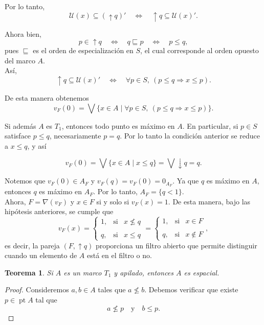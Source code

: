 \documentclass[11pt]{amsart}
\DeclareMathOperator{\pt}{pt}
\theoremstyle{plain}
\newtheorem{thm}{Teorema}[section]
\theoremstyle{definition}
\begin{document}
Por lo tanto,
\[
\mathcal{U}(x)\subseteq (\uparrow q)'
\quad\Longleftrightarrow\quad
\uparrow q\subseteq \mathcal{U}(x)'.
\]

Ahora bien,
\[
p\in \uparrow q
\quad\Longleftrightarrow\quad
q\sqsubseteq p
\quad\Longleftrightarrow\quad
p\leq q,
\]
pues $\sqsubseteq$ es el orden de especialización en $S$, el cual corresponde al orden
opuesto del marco $A$.\\

Así,
\[
\uparrow q\subseteq \mathcal{U}(x)'
\quad\Longleftrightarrow\quad
\forall p\in S,\ (p\leq q \Rightarrow x\leq p).
\]

De esta manera obtenemos
\[
v_F(0)
=\bigvee\{x\in A\mid \forall p\in S,\ (p\leq q \Rightarrow x\leq p)\}.
\]

Si además $A$ es $T_1$, entonces todo punto es máximo en $A$. En particular, si
$p\in S$ satisface $p\leq q$, necesariamente $p=q$. Por lo tanto la condición
anterior se reduce a $x\leq q$, y así

\[
v_F(0)
=\bigvee\{x\in A\mid x\leq q\}
=\bigvee \downarrow q
=q.
\]

Notemos que $v_F(0)\in A_F$ y $v_F(q)=v_F(0)=0_{A_F}$. Ya que $q$ es máximo en $A$, entonces $q$ es máximo en $A_F$.
Por lo tanto, $A_F=\{q<1\}$.\\

Ahora, $F=\nabla(v_F)$ y $x\in F$ si y solo si $v_F(x)=1$. De esta manera, bajo las hipótesis anteriores, se cumple que 
\[
v_F(x)= \left\{ \begin{array}{lcc} 1, & \text{si}  &  x\nleq q\\ \\ q, & \text{si} & x\leq q 
\end{array} \right.=  \left\{ \begin{array}{lcc} 1, & \text{si}  &  x\in F\\ \\ q, & \text{si} & x\not\in F \end{array} \right.,
\]
es decir, la pareja $(F, \uparrow q)$ proporciona un filtro abierto que permite distinguir 
cuando un elemento de $A$ está en el filtro o no.

\begin{thm}\label{Testespacial}
Si $A$ es un marco $T_1$ y apilado, entonces $A$ es espacial.
\end{thm}

\begin{proof}
Consideremos $a, b\in A$ tales que $a\nleq b$. Debemos verificar que existe $p\in \pt A$ tal que 
\[
a\nleq p\quad \text{y}\quad b\leq p.
\]
\end{proof}
\end{document}
